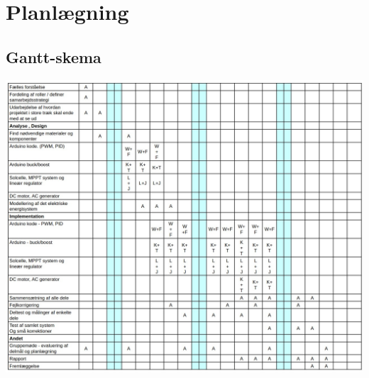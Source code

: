 \section{Planlægning}

\subsection{Gantt-skema}
\includegraphics[width=\textwidth]{Dokumentation/Figures/Gantt Chart.jpg}
\label{fig: Gantt-Skema}
